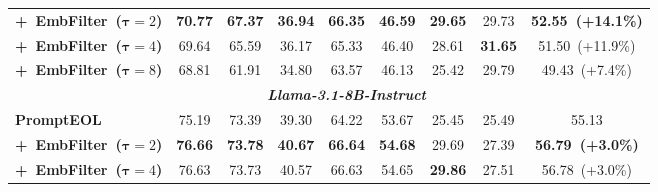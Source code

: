 \documentclass{llmxive}
\begin{document}
\begin{table}[t]
{\begin{tabular}{lcccccccc}
            \cmidrule(l{1pt}r{1pt}){1-9}
            \quad \textbf{\textrm{+~EmbFilter~(\(\mathbf{\tau}=2\))}} & \cellcolor{MediumPurple!15} \textbf{70.77} & \cellcolor{MediumPurple!15} \textbf{67.37} & \cellcolor{MediumPurple!15} \textbf{36.94} & \cellcolor{MediumPurple!15} \textbf{66.35} & \cellcolor{MediumPurple!15} \textbf{46.59} & \cellcolor{MediumPurple!15} \textbf{29.65} & \cellcolor{MediumPurple!15} 29.73 & \cellcolor{MediumPurple!15} \textbf{52.55~(+14.1\%)} \\
            \quad \textbf{\textrm{+~EmbFilter~(\(\mathbf{\tau}=4\))}} & \cellcolor{MediumPurple!15} 69.64 & \cellcolor{MediumPurple!15} 65.59 & \cellcolor{MediumPurple!15} 36.17 & \cellcolor{MediumPurple!15} 65.33 & \cellcolor{MediumPurple!15} 46.40 & \cellcolor{MediumPurple!15} 28.61 & \cellcolor{MediumPurple!15} \textbf{31.65} & \cellcolor{MediumPurple!15} 51.50~(+11.9\%) \\
            \quad \textbf{\textrm{+~EmbFilter~(\(\mathbf{\tau}=8\))}} & \cellcolor{MediumPurple!15} 68.81 & 61.91 & \cellcolor{MediumPurple!15} 34.80 & \cellcolor{MediumPurple!15} 63.57 & \cellcolor{MediumPurple!15} 46.13 & \cellcolor{MediumPurple!15} 25.42 & \cellcolor{MediumPurple!15} 29.79 & \cellcolor{MediumPurple!15} 49.43~(+7.4\%) \\
            \midrule
            \multicolumn{1}{c}{} & \multicolumn{7}{c}{\textbf{\textit{\textrm{Llama-3.1-8B-Instruct}}}} \\
            \midrule
            \textbf{\textrm{PromptEOL}} & 75.19 & 73.39 & 39.30 & 64.22 & 53.67 & 25.45 & 25.49 & 55.13   \\
            \cmidrule(l{1pt}r{1pt}){1-9}
            \quad \textbf{\textrm{+~EmbFilter~(\(\mathbf{\tau}=2\))}} & \cellcolor{MediumTurquoise!15} \textbf{76.66} & \cellcolor{MediumTurquoise!15} \textbf{73.78} & \cellcolor{MediumTurquoise!15} \textbf{40.67} & \cellcolor{MediumTurquoise!15} \textbf{66.64} & \cellcolor{MediumTurquoise!15} \textbf{54.68} & \cellcolor{MediumTurquoise!15} 29.69 & \cellcolor{MediumTurquoise!15} 27.39 & \cellcolor{MediumTurquoise!15} \textbf{56.79~(+3.0\%) }\\
            \quad \textbf{\textrm{+~EmbFilter~(\(\mathbf{\tau}=4\))}} & \cellcolor{MediumTurquoise!15} 76.63 & \cellcolor{MediumTurquoise!15} 73.73 & \cellcolor{MediumTurquoise!15} 40.57 & \cellcolor{MediumTurquoise!15} 66.63 & \cellcolor{MediumTurquoise!15} 54.65 & \cellcolor{MediumTurquoise!15} \textbf{29.86} & \cellcolor{MediumTurquoise!15} 27.51 & \cellcolor{MediumTurquoise!15} 56.78~(+3.0\%) \\

\end{tabular}}
\end{table}
\end{document}
